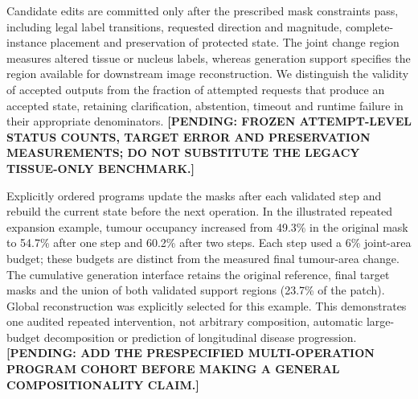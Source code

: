Candidate edits are committed only after the prescribed mask constraints pass,
including legal label transitions, requested direction and magnitude,
complete-instance placement and preservation of protected state. The joint
change region measures altered tissue or nucleus labels, whereas generation
support specifies the region available for downstream image reconstruction.
We distinguish the validity of accepted outputs from the fraction of attempted
requests that produce an accepted state, retaining clarification, abstention,
timeout and runtime failure in their appropriate denominators.
\textbf{[PENDING: FROZEN ATTEMPT-LEVEL STATUS COUNTS, TARGET ERROR AND PRESERVATION
MEASUREMENTS; DO NOT SUBSTITUTE THE LEGACY TISSUE-ONLY BENCHMARK.]}

Explicitly ordered programs update the masks after each validated step and
rebuild the current state before the next operation. In the illustrated repeated
expansion example, tumour occupancy increased from 49.3\% in the original mask
to 54.7\% after one step and 60.2\% after two steps. Each step used a 6\% joint-area
budget; these budgets are distinct from the measured final tumour-area change.
The cumulative generation interface retains the original reference, final target
masks and the union of both validated support regions (23.7\% of the patch).
Global reconstruction was explicitly selected for this example. This demonstrates
one audited repeated intervention, not arbitrary composition, automatic
large-budget decomposition or prediction of longitudinal disease progression.
\textbf{[PENDING: ADD THE PRESPECIFIED MULTI-OPERATION PROGRAM COHORT BEFORE MAKING
A GENERAL COMPOSITIONALITY CLAIM.]}
